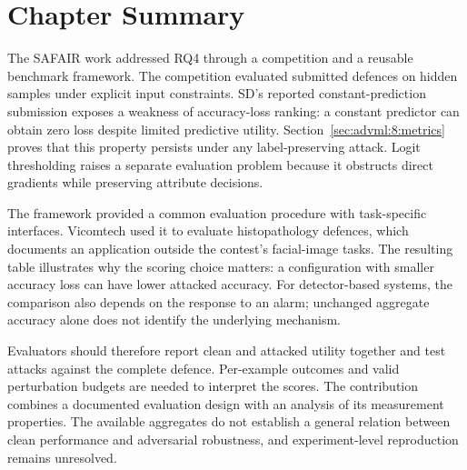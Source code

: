 \section{Chapter Summary}
\label{sec:advml:11}

The SAFAIR work addressed RQ4 through a competition and a reusable benchmark framework.
The competition evaluated submitted defences on hidden samples under explicit input
constraints. SD's reported constant-prediction submission exposes a weakness of accuracy-loss
ranking: a constant predictor can obtain zero loss despite limited predictive utility.
Section~\ref{sec:advml:8:metrics} proves that this property persists under any label-preserving
attack. Logit thresholding raises a separate evaluation problem because it obstructs direct
gradients while preserving attribute decisions.

The framework provided a common evaluation procedure with task-specific interfaces.
Vicomtech used it to evaluate histopathology defences, which documents an application outside
the contest's facial-image tasks. The resulting table illustrates why the scoring choice
matters: a configuration with smaller accuracy loss can have lower attacked accuracy.
For detector-based systems, the comparison also depends on the response to an alarm;
unchanged aggregate accuracy alone does not identify the underlying mechanism.

Evaluators should therefore report clean and attacked utility together and test attacks
against the complete defence. Per-example outcomes and valid perturbation budgets are
needed to interpret the scores. The contribution combines a documented evaluation design
with an analysis of its measurement properties. The available aggregates do not establish
a general relation between clean performance and adversarial robustness, and experiment-level
reproduction remains unresolved.

